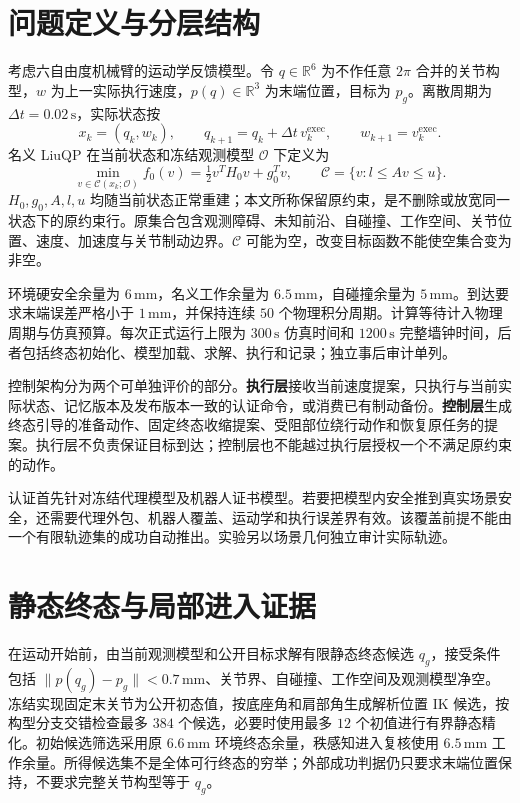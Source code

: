 \section{问题定义与分层结构}
考虑六自由度机械臂的运动学反馈模型。令 $q\in\mathbb R^6$ 为不作任意 $2\pi$ 合并的关节构型，$w$ 为上一实际执行速度，$p(q)\in\mathbb R^3$ 为末端位置，目标为 $p_g$。离散周期为 $\Delta t=0.02\,\mathrm{s}$，实际状态按
\begin{equation}
 x_k=(q_k,w_k),\qquad q_{k+1}=q_k+\Delta t\,v_k^{\mathrm{exec}},\qquad w_{k+1}=v_k^{\mathrm{exec}}.\tag{M1}
\end{equation}
名义 LiuQP 在当前状态和冻结观测模型 $\mathcal O$ 下定义为
\begin{equation}
 \min_{v\in\mathcal C(x_k;\mathcal O)} f_0(v)
 =\tfrac12v^T H_0v+g_0^Tv,\qquad
 \mathcal C=\{v:l\le Av\le u\}.\tag{M2}
\end{equation}
$H_0,g_0,A,l,u$ 均随当前状态正常重建；本文所称保留原约束，是不删除或放宽同一状态下的原约束行。原集合包含观测障碍、未知前沿、自碰撞、工作空间、关节位置、速度、加速度与关节制动边界。$\mathcal C$ 可能为空，改变目标函数不能使空集合变为非空。

环境硬安全余量为 $6\,\mathrm{mm}$，名义工作余量为 $6.5\,\mathrm{mm}$，自碰撞余量为 $5\,\mathrm{mm}$。到达要求末端误差严格小于 $1\,\mathrm{mm}$，并保持连续 $50$ 个物理积分周期。计算等待计入物理周期与仿真预算。每次正式运行上限为 $300\,\mathrm{s}$ 仿真时间和 $1200\,\mathrm{s}$ 完整墙钟时间，后者包括终态初始化、模型加载、求解、执行和记录；独立事后审计单列。

控制架构分为两个可单独评价的部分。\textbf{执行层}接收当前速度提案，只执行与当前实际状态、记忆版本及发布版本一致的认证命令，或消费已有制动备份。\textbf{控制层}生成终态引导的准备动作、固定终态收缩提案、受阻部位绕行动作和恢复原任务的提案。执行层不负责保证目标到达；控制层也不能越过执行层授权一个不满足原约束的动作。

认证首先针对冻结代理模型及机器人证书模型。若要把模型内安全推到真实场景安全，还需要代理外包、机器人覆盖、运动学和执行误差界有效。该覆盖前提不能由一个有限轨迹集的成功自动推出。实验另以场景几何独立审计实际轨迹。

\section{静态终态与局部进入证据}
在运动开始前，由当前观测模型和公开目标求解有限静态终态候选 $q_g$，接受条件包括 $\|p(q_g)-p_g\|<0.7\,\mathrm{mm}$、关节界、自碰撞、工作空间及观测模型净空。冻结实现固定末关节为公开初态值，按底座角和肩部角生成解析位置 IK 候选，按构型分支交错检查最多 $384$ 个候选，必要时使用最多 $12$ 个初值进行有界静态精化。初始候选筛选采用原 $6.6\,\mathrm{mm}$ 环境终态余量，秩感知进入复核使用 $6.5\,\mathrm{mm}$ 工作余量。所得候选集不是全体可行终态的穷举；外部成功判据仍只要求末端位置保持，不要求完整关节构型等于 $q_g$。

